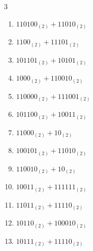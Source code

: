 \begin{multicols}{3}
\begin{enumerate}
  \item $110100_{(2)} + 11010_{(2)}$


  \item $1100_{(2)} + 11101_{(2)}$


\columnbreak %

  \item $101101_{(2)} + 10101_{(2)}$


  \item $1000_{(2)} + 110010_{(2)}$


  \item $110000_{(2)} + 111001_{(2)}$


  \item $101100_{(2)} + 10011_{(2)}$


  \item $11000_{(2)} + 10_{(2)}$


  \item $100101_{(2)} + 11010_{(2)}$


  \item $110010_{(2)} + 10_{(2)}$


  \item $10011_{(2)} + 111111_{(2)}$


  \item $11011_{(2)} + 11110_{(2)}$


  \item $10110_{(2)} + 100010_{(2)}$


\columnbreak %

  \item $10111_{(2)} + 11110_{(2)}$



\end{enumerate}
\end{multicols}
